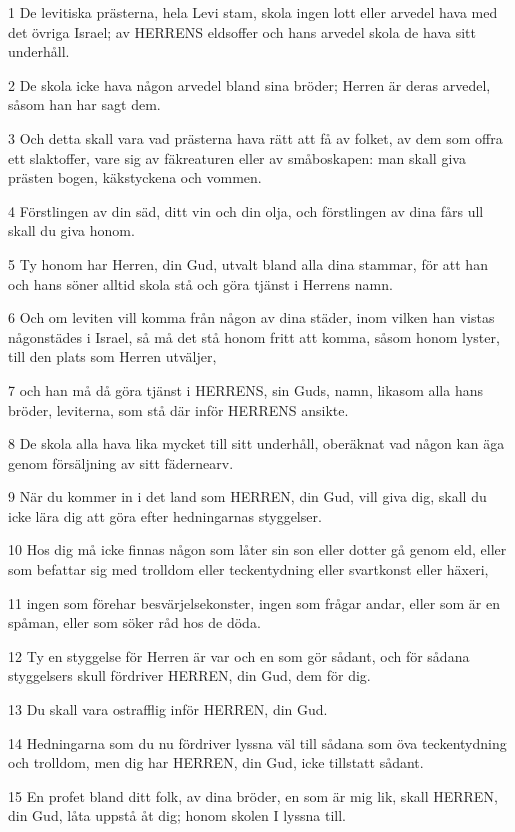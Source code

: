\par 1 De levitiska prästerna, hela Levi stam, skola ingen lott eller arvedel hava med det övriga Israel; av HERRENS eldsoffer och hans arvedel skola de hava sitt underhåll.
\par 2 De skola icke hava någon arvedel bland sina bröder; Herren är deras arvedel, såsom han har sagt dem.
\par 3 Och detta skall vara vad prästerna hava rätt att få av folket, av dem som offra ett slaktoffer, vare sig av fäkreaturen eller av småboskapen: man skall giva prästen bogen, käkstyckena och vommen.
\par 4 Förstlingen av din säd, ditt vin och din olja, och förstlingen av dina fårs ull skall du giva honom.
\par 5 Ty honom har Herren, din Gud, utvalt bland alla dina stammar, för att han och hans söner alltid skola stå och göra tjänst i Herrens namn.
\par 6 Och om leviten vill komma från någon av dina städer, inom vilken han vistas någonstädes i Israel, så må det stå honom fritt att komma, såsom honom lyster, till den plats som Herren utväljer,
\par 7 och han må då göra tjänst i HERRENS, sin Guds, namn, likasom alla hans bröder, leviterna, som stå där inför HERRENS ansikte.
\par 8 De skola alla hava lika mycket till sitt underhåll, oberäknat vad någon kan äga genom försäljning av sitt fädernearv.
\par 9 När du kommer in i det land som HERREN, din Gud, vill giva dig, skall du icke lära dig att göra efter hedningarnas styggelser.
\par 10 Hos dig må icke finnas någon som låter sin son eller dotter gå genom eld, eller som befattar sig med trolldom eller teckentydning eller svartkonst eller häxeri,
\par 11 ingen som förehar besvärjelsekonster, ingen som frågar andar, eller som är en spåman, eller som söker råd hos de döda.
\par 12 Ty en styggelse för Herren är var och en som gör sådant, och för sådana styggelsers skull fördriver HERREN, din Gud, dem för dig.
\par 13 Du skall vara ostrafflig inför HERREN, din Gud.
\par 14 Hedningarna som du nu fördriver lyssna väl till sådana som öva teckentydning och trolldom, men dig har HERREN, din Gud, icke tillstatt sådant.
\par 15 En profet bland ditt folk, av dina bröder, en som är mig lik, skall HERREN, din Gud, låta uppstå åt dig; honom skolen I lyssna till.
